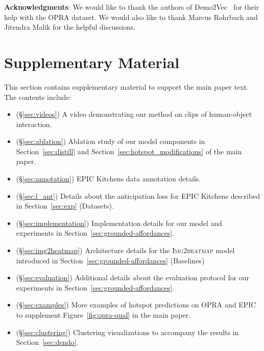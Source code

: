 \documentclass[10pt,twocolumn,letterpaper]{article}
\newcommand{\SC}[1]{{\textsc{#1}}}
\newcommand{\reffig}[1]{Figure~\ref{#1}}
\newcommand{\refsec}[1]{Section~\ref{#1}}
\begin{document}
\vspace{0.1in}
{\noindent\textbf{Acknowledgments}: We would like to thank the authors of Demo2Vec~\cite{fang2018demo2vec} for their help with the OPRA dataset. We would also like to thank Marcus Rohrbach and Jitendra Malik for the helpful discussions.}
 
{\small


}

\newpage

\setcounter{section}{0}
\setcounter{figure}{0}
\setcounter{table}{0}
\renewcommand{\thesection}{S\arabic{section}}
\renewcommand{\thetable}{S\arabic{table}}
\renewcommand{\thefigure}{S\arabic{figure}}

\section*{Supplementary Material}

This section contains supplementary material to support the main paper text. The contents include:
\begin{itemize}[leftmargin=*]
\itemsep0em 
    \item (\S\ref{sec:videos}) A video demonstrating our method on clips of human-object interaction.
    \item (\S\ref{sec:ablation}) Ablation study of our model components in \refsec{sec:distill} and \refsec{sec:hotspot_modifications} of the main paper.
    \item (\S\ref{sec:annotation}) EPIC Kitchens data annotation details. 
    \item (\S\ref{sec:l_ant}) Details about the anticipation loss  for EPIC Kitchens described in \refsec{sec:exp} (Datasets).      
    \item (\S\ref{sec:implementation}) Implementation details for our model and experiments in \refsec{sec:grounded-affordances}.
    \item (\S\ref{sec:img2heatmap}) Architecture details for the \SC{Img2heatmap} model introduced in \refsec{sec:grounded-affordances} (Baselines)
    \item (\S\ref{sec:evaluation}) Additional details about the evaluation protocol for our experiments in \refsec{sec:grounded-affordances}.
    \item (\S\ref{sec:examples}) More examples of hotspot predictions on OPRA and EPIC to supplement \reffig{fig:opra-qual} in the main paper.
    \item (\S\ref{sec:clustering}) Clustering visualizations to accompany the results in \refsec{sec:dendo}.
\end{itemize}
\end{document}
